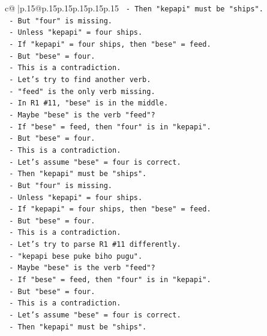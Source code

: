 \documentclass{article}
\begin{document}
{\begin{supertabular}{c@{$\;$}|p{.15\linewidth}@{}p{.15\linewidth}p{.15\linewidth}p{.15\linewidth}p{.15\linewidth}p{.15\linewidth}}
{{{\texttt{        {-} Then "kepapi" must be "ships".} \\
\texttt{        {-} But "four" is missing.} \\
\texttt{        {-} Unless "kepapi" = four ships.} \\
\texttt{        {-} If "kepapi" = four ships, then "bese" = feed.} \\
\texttt{        {-} But "bese" = four.} \\
\texttt{        {-} This is a contradiction.} \\
\texttt{        {-} Let's try to find another verb.} \\
\texttt{        {-} "feed" is the only verb missing.} \\
\texttt{        {-} In R1 \#11, "bese" is in the middle.} \\
\texttt{        {-} Maybe "bese" is the verb "feed"?} \\
\texttt{        {-} If "bese" = feed, then "four" is in "kepapi".} \\
\texttt{        {-} But "bese" = four.} \\
\texttt{        {-} This is a contradiction.} \\
\texttt{        {-} Let's assume "bese" = four is correct.} \\
\texttt{        {-} Then "kepapi" must be "ships".} \\
\texttt{        {-} But "four" is missing.} \\
\texttt{        {-} Unless "kepapi" = four ships.} \\
\texttt{        {-} If "kepapi" = four ships, then "bese" = feed.} \\
\texttt{        {-} But "bese" = four.} \\
\texttt{        {-} This is a contradiction.} \\
\texttt{        {-} Let's try to parse R1 \#11 differently.} \\
\texttt{        {-} "kepapi bese puke biho pugu".} \\
\texttt{        {-} Maybe "bese" is the verb "feed"?} \\
\texttt{        {-} If "bese" = feed, then "four" is in "kepapi".} \\
\texttt{        {-} But "bese" = four.} \\
\texttt{        {-} This is a contradiction.} \\
\texttt{        {-} Let's assume "bese" = four is correct.} \\
\texttt{        {-} Then "kepapi" must be "ships".} \\
}}}
\end{supertabular}}
\end{document}
